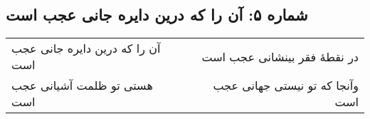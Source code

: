 \begin{center}
\section*{شماره ۵: آن را که درین دایره جانی عجب است}
\label{sec:005}
\begin{longtable}{l p{0.5cm} r}
آن را که درین دایره جانی عجب است
&&
در نقطهٔ فقر بینشانی عجب است
\\
هستی تو ظلمت آشیانی عجب است
&&
وآنجا که تو نیستی جهانی عجب است
\\
\end{longtable}
\end{center}
